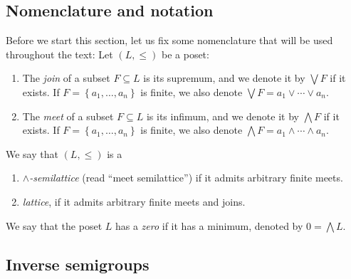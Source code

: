 %


%

\subsection*{Nomenclature and notation}

Before we start this section, let us fix some nomenclature that will be used throughout the text: Let $(L,\leq)$ be a poset:
\begin{enumerate}
\item The \emph{join} of a subset $F\subseteq L$ is its supremum, and we denote it by $\bigvee F$ if it exists. If $F=\left\{a_1,\ldots,a_n\right\}$ is finite, we also denote $\bigvee F=a_1\lor\cdots\lor a_n$.
\item The \emph{meet} of a subset $F\subseteq L$ is its infimum, and we denote it by $\bigwedge F$ if it exists. If $F=\left\{a_1,\ldots,a_n\right\}$ is finite, we also denote $\bigwedge F=a_1\land\cdots\land a_n$.
\end{enumerate}

We say that $(L,\leq)$ is a
\begin{enumerate}
\item[3.] \emph{$\wedge$-semilattice} (read ``meet semilattice'') if it admits arbitrary finite meets.
\item[4.] \emph{lattice}, if it admits arbitrary finite meets and joins.
\end{enumerate}

We say that the poset $L$ has a \emph{zero} if it has a minimum, denoted by $0=\bigwedge L$.

\subsection{Inverse semigroups}

